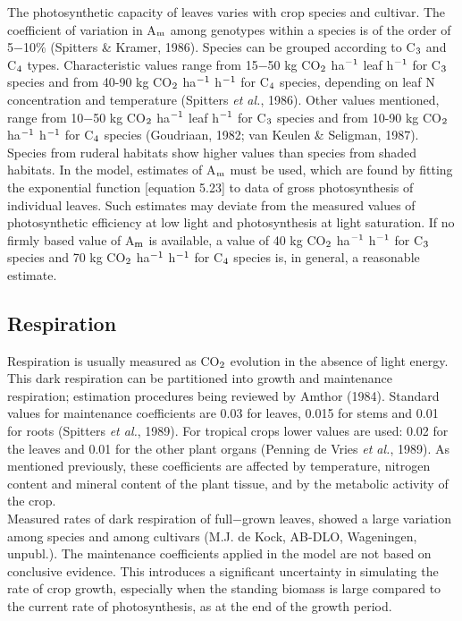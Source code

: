 The photosynthetic capacity of leaves varies with crop species and cultivar. The coeffi\-cient of variation in A$_{{\rm m}}$ among genotypes within a species is of the order of 5$-$10\%
(Spitters \& Kramer, 1986). Species can be grouped according to C$_{{\rm 3}}$ and C$_{{\rm 4}}$ types.
Characteristic values range from 15$-$50 kg CO$_{{\rm 2}}$ ha$^{{\rm -}{1}}$ leaf h$^{{\rm -}{1}}$ for C$_{{\rm 3}}$ species and from 40-90
kg CO$_{{\rm 2}}$ ha$^{{\rm -1}}$ h$^{{\rm -1}}$ for C$_{{\rm 4}}$ species, depending on leaf N concentration and temperature
(Spitters {\it et al.\/}, 1986). Other values mentioned, range from 10$-$50 kg CO$_{{\rm 2}}$ ha$^{{\rm -}{1}}$ leaf h$^{{\rm -}{1}}$ for
C$_{{\rm 3}}$ species and from 10-90 kg CO$_{{\rm 2}}$ ha$^{{\rm -1}}$ h$^{{\rm -1}}$ for C$_{{\rm 4}}$ species (Goudriaan, 1982; van Keulen \&
Seligman, 1987). Species from ruderal habitats show higher values than species from
shaded habitats. In the model, estimates of A$_{{\rm m}}$ must be used, which are found by fitting
the exponential function [equation 5.23] to data of gross photosynthesis of individual
leaves. Such estimates may deviate from the measured values of photosynthetic efficiency
at low light and photosynthesis at light saturation. If no firmly based value of A$_{{\rm m}}$ is
available, a value of 40 kg CO$_{{\rm 2}}$ ha$^{{\rm -1}}$ h$^{{\rm -}{1}}$ for C$_{{\rm 3}}$ species and 70 kg CO$_{{\rm 2}}$ ha$^{{\rm -1}}$ h$^{{\rm -1}}$ for C$_{{\rm 4}}$
species is, in general, a reasonable estimate.

\subsection{Respiration} 

Respiration is usually measured as CO$_{{\rm 2}}$ evolution in the absence of light energy. This
dark respiration can be partitioned into growth and maintenance respiration; estimation
procedures being reviewed by Amthor (1984). Standard values for maintenance coeffi\-cients are 0.03 for leaves, 0.015 for stems and 0.01 for roots (Spitters {\it et al.\/}, 1989). For
tropical crops lower values are used: 0.02 for the leaves and 0.01 for the other plant
organs (Penning de Vries {\it et al.\/}, 1989). As mentioned previously, these coefficients are
affected by temperature, nitrogen content and mineral content of the plant tissue, and by
the metabolic activity of the crop.   \\
Measured rates of dark respiration of full$-$grown leaves, showed a large variation among
species and among cultivars (M.J. de Kock, AB-DLO, Wageningen, unpubl.). The
maintenance coefficients applied in the model are not based on conclusive evidence. This
introduces a significant uncertainty in simulating the rate of crop growth, especially when
the standing biomass is large compared to the current rate of photosynthesis, as at the end
of the growth period.   

